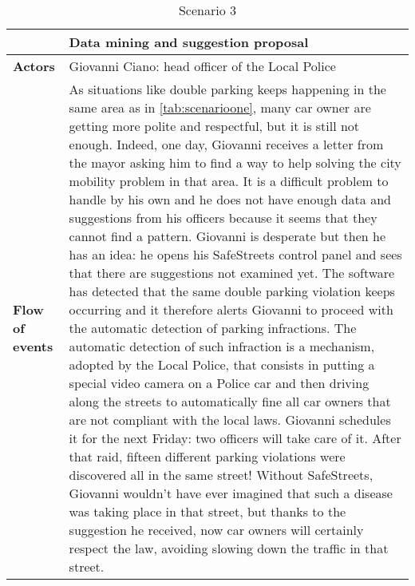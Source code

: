 \begin{table}[!htbp]
	\centering
\begin{tabular}{lp{9.5cm}}
\hline
\bf\large  &\bf\large Data mining and suggestion proposal\\
\hline
\hline

\bf Actors&Giovanni Ciano: head officer of the Local Police\\
\hline
\bf Flow of events&
As situations like double parking keeps happening in the same area as in \autoref{tab:scenarioone}, many car owner are getting more polite and respectful, but it is still not enough. Indeed, one day, Giovanni receives a letter from the mayor asking him to find a way to help solving the city mobility problem in that area. It is a difficult problem to handle by his own and he does not have enough data and suggestions from his officers because it seems that they cannot find a pattern. Giovanni is desperate but then he has an idea: he opens his SafeStreets control panel and sees that there are suggestions not examined yet. The software has detected that the same double parking violation keeps occurring and it therefore alerts Giovanni to proceed with the automatic detection of parking infractions.
The automatic detection of such infraction is a mechanism, adopted by the Local Police, that consists in putting a special video camera on a Police car and then driving along the streets to automatically fine all car owners that are not compliant with the local laws. Giovanni schedules it for the next Friday: two officers will take care of it. After that raid, fifteen different parking violations were discovered all in the same street! Without SafeStreets, Giovanni wouldn't have ever imagined that such a disease was taking place in that street, but thanks to the suggestion he received, now car owners will certainly respect the law, avoiding slowing down the traffic in that street.
\end{tabular}
\caption{Scenario 3} 
\label{tab:scenariothree}
\end{table}
